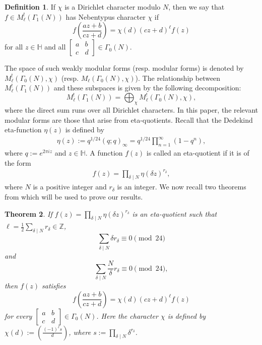 \documentclass[reqno]{amsart}
\newtheorem{theorem}{Theorem}[section]
\theoremstyle{definition}
\newtheorem{definition}[theorem]{Definition}
\theoremstyle{remark}
\numberwithin{equation}{section}
\begin{document}
\begin{definition}\cite[Definition 1.15]{ono2004}
	If $\chi$ is a Dirichlet character modulo $N$, then we say that $f\in M^{!}_{\ell}(\Gamma_1(N))$ has Nebentypus character $\chi$ if
	$$f\left( \frac{az+b}{cz+d}\right)=\chi(d)(cz+d)^{\ell}f(z)$$ for all $z\in \mathbb{H}$ and all $\begin{bmatrix}
	a  &  b \\
	c  &  d      
	\end{bmatrix} \in \Gamma_0(N)$.
\end{definition}	
	 The space of such weakly modular forms (resp. modular forms) is denoted by $M^{!}_{\ell}(\Gamma_0(N), \chi)$ (resp. $M_{\ell}(\Gamma_0(N), \chi)$). The relationship between $M^{!}_{\ell}(\Gamma_1(N))$ and these subspaces is given by the following decomposition:
 $$M_{\ell}^{!}\left(\Gamma_{1}(N)\right)=\bigoplus_{\chi} M_{\ell}^{!}\left(\Gamma_{0}(N), \chi\right),$$
 where the direct sum runs over all Dirichlet characters.
In this paper, the relevant modular forms are those that arise from eta-quotients. Recall that the Dedekind eta-function $\eta(z)$ is defined by
\begin{align*}
\eta(z):=q^{1/24}(q;q)_{\infty}=q^{1/24}\prod_{n=1}^{\infty}(1-q^n),
\end{align*}
where $q:=e^{2\pi iz}$ and $z\in \mathbb{H}$. A function $f(z)$ is called an eta-quotient if it is of the form
\begin{align*}
f(z)=\prod_{\delta\mid N}\eta(\delta z)^{r_\delta},
\end{align*}
where $N$ is a positive integer and $r_{\delta}$ is an integer. We now recall two theorems from \cite[p. 18]{ono2004} which will be used to prove our results.
\begin{theorem}\cite[Theorem 1.64]{ono2004}\label{thm_ono1} If $f(z)=\prod_{\delta\mid N}\eta(\delta z)^{r_\delta}$ 
	is an eta-quotient such that $\ell=\frac{1}{2}\sum_{\delta\mid N}r_{\delta}\in \mathbb{Z}$, 
	$$\sum_{\delta\mid N} \delta r_{\delta}\equiv 0 \pmod{24}$$ and
	$$\sum_{\delta\mid N} \frac{N}{\delta}r_{\delta}\equiv 0 \pmod{24},$$
	then $f(z)$ satisfies $$f\left( \frac{az+b}{cz+d}\right)=\chi(d)(cz+d)^{\ell}f(z)$$
	for every  $\begin{bmatrix}
	a  &  b \\
	c  &  d      
	\end{bmatrix} \in \Gamma_0(N)$. Here the character $\chi$ is defined by $\chi(d):=\left(\frac{(-1)^{\ell} s}{d}\right)$, where $s:= \prod_{\delta\mid N}\delta^{r_{\delta}}$. 
\end{theorem}
\end{document}

